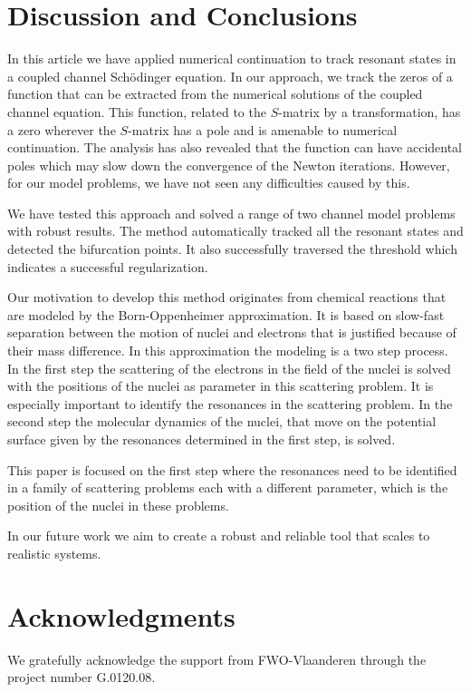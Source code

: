\documentclass[mathpazo]{cicp}
\begin{document}
\section{Discussion and Conclusions}
In this article we have applied numerical continuation to track resonant states
in a coupled channel Sch\"odinger equation. In our approach, we track the zeros of a function that can be extracted from the numerical solutions 
of the coupled channel equation. This function, related to the $S$-matrix by a transformation, has a zero wherever the $S$-matrix has a pole and is amenable to
numerical continuation.
The analysis has also revealed that the function can have accidental poles which may slow down the convergence of the Newton iterations. However, for our model 
problems, we have not seen any difficulties caused by this. 

We have tested this approach and solved a range of two channel model problems with robust results. The method automatically tracked all the resonant 
states and detected the bifurcation points. It also successfully traversed the threshold which indicates a successful regularization.

Our motivation to develop this method originates from chemical reactions that are modeled by the Born-Oppenheimer approximation. It is based on slow-fast separation 
between the motion of nuclei and electrons that is justified because of their mass difference. In this approximation the modeling is a two step process. In the first step the 
scattering of the electrons in the field of the nuclei is solved with the positions of the nuclei as parameter in this scattering problem. It is especially important to identify the 
resonances in the scattering problem. In the second step the molecular dynamics of the nuclei, that move on the potential surface given by the resonances determined 
in the first step, is solved.

This paper is focused on the first step where the resonances need to be identified in a family of scattering problems each with a different parameter, which is the position 
of the nuclei in these problems.

In our future work we aim to create a robust and reliable tool that scales to realistic systems.

\section*{Acknowledgments}
We gratefully acknowledge the support from FWO-Vlaanderen through the project number G.0120.08. 
\end{document}

